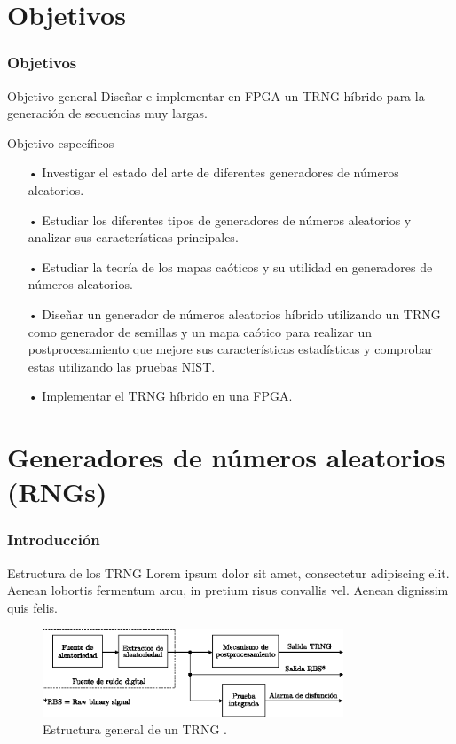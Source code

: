 \documentclass[10pt]{beamer}
\begin{document}
\section{Objetivos}
\begin{frame}
    \frametitle{Objetivos}
    \begin{block}{Objetivo general}
        \justifying
        Diseñar e implementar en FPGA un TRNG híbrido para la generación de secuencias muy largas.
	\end{block}

    \begin{block}{Objetivo específicos}
        \justifying
        \begin{itemize}
            \item[•] Investigar el estado del arte de diferentes generadores de números aleatorios.
            \item[•] Estudiar los diferentes tipos de generadores de números aleatorios y analizar sus características principales.
            \item[•] Estudiar la teoría de los mapas caóticos y su utilidad en generadores de números aleatorios.
            \item[•] Diseñar un generador de números aleatorios híbrido utilizando un TRNG como generador de semillas y un mapa caótico para realizar un postprocesamiento que mejore sus características estadísticas y comprobar estas utilizando las pruebas NIST.
            \item[•] Implementar el TRNG híbrido en una FPGA.
        \end{itemize}
	\end{block}

\end{frame}

\section{Generadores de números aleatorios (RNGs)}
\begin{frame}
    \frametitle{Introducción}
    \begin{block}{Estructura de los TRNG}
        \justifying
        Lorem ipsum dolor sit amet, consectetur adipiscing elit. Aenean lobortis fermentum arcu, in pretium risus convallis vel. Aenean dignissim quis felis.
	\end{block}
	
	\begin{figure}[hbtp]
	    \centering
	    \includegraphics[width=0.8\textwidth]{A0_TRNG_estructura}
	    \caption{Estructura general de un TRNG \cite{Badrignans2011}.}
        \label{fig:A1_TRNG_estructura}
    \end{figure}
\end{frame}
\end{document}
